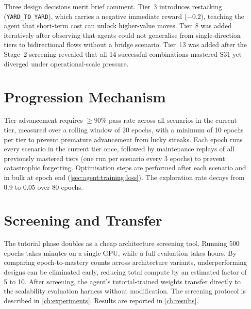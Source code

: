 \label{sec:curr:scenarios:tier0}%
\label{sec:curr:scenarios:tier4}%
\label{sec:curr:scenarios:tier8}%
\label{sec:curr:scenarios:tier9}%
\label{sec:curr:scenarios:structure}%
\label{sec:curr:scenarios:overview}%

Three design decisions merit brief comment. Tier~3 introduces restacking (\texttt{YARD\_TO\_YARD}), which carries a negative immediate reward ($-0.2$), teaching the agent that short-term cost can unlock higher-value moves. Tier~8 was added iteratively after observing that agents could not generalise from single-direction tiers to bidirectional flows without a bridge scenario. Tier~13 was added after the Stage~2 screening revealed that all 14 successful combinations mastered S31 yet diverged under operational-scale pressure.

\section{Progression Mechanism}
\label{sec:curr:tiers}
\label{sec:curr:tiers:mastery}

Tier advancement requires $\geq 90\%$ pass rate across all scenarios in the current tier, measured over a rolling window of 20 epochs, with a minimum of 10 epochs per tier to prevent premature advancement from lucky streaks. Each epoch runs every scenario in the current tier once, followed by maintenance replays of all previously mastered tiers (one run per scenario every 3 epochs) to prevent catastrophic forgetting. Optimisation steps are performed after each scenario and in bulk at epoch end (\cref{sec:agent:training:loss}). The exploration rate decays from 0.9 to 0.05 over 80 epochs.

\label{sec:curr:tiers:epochs}

\section{Screening and Transfer}
\label{sec:curr:screening}
\label{sec:curr:transition}

The tutorial phase doubles as a cheap architecture screening tool. Running 500 epochs takes minutes on a single GPU, while a full evaluation takes hours. By comparing epoch-to-mastery counts across architecture variants, underperforming designs can be eliminated early, reducing total compute by an estimated factor of 5 to 10. After screening, the agent's tutorial-trained weights transfer directly to the scalability evaluation harness without modification. The screening protocol is described in \cref{ch:experiments}. Results are reported in \cref{ch:results}.
